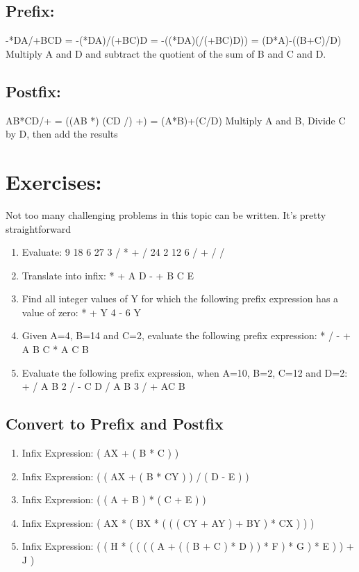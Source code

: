 \documentclass[11pt,letterpaper]{article}
\begin{document}
\subsection{Prefix:}
-*DA/+BCD = -(*DA)/(+BC)D = -((*DA)(/(+BC)D)) = (D*A)-((B+C)/D) Multiply A and D and subtract the quotient of the sum of B and C and D.

\subsection{Postfix:}
AB*CD/+ = ((AB *) (CD /) +) = (A*B)+(C/D)
Multiply A and B, Divide C by D, then add the results

\section{Exercises:}
Not too many challenging problems in this topic can be written. It's pretty straightforward

\begin{enumerate}

\item Evaluate: 9 18 6 27 3 / * + / 24 2 12 6 / + / /

\item Translate into infix: * + A D - + B C E

\item Find all integer values of Y for which the following prefix expression has
a value of zero: * + Y 4 - 6 Y

\item Given A=4, B=14 and C=2, evaluate the following prefix expression: * / - + A B C * A C B

\item Evaluate the following prefix expression, when A=10, B=2, C=12 and D=2:\\
+ / A B 2  / - C D / A B 3 / + AC B
\end{enumerate}

\subsection{Convert to Prefix and Postfix}
\label{sec:convert}

\begin{enumerate}
\item Infix Expression: ( AX + ( B * C ) ) 

\item Infix Expression: ( ( AX + ( B * CY ) ) / ( D - E ) )

\item Infix Expression: ( ( A + B ) * ( C + E ) ) 

\item Infix Expression: ( AX * ( BX * ( ( ( CY + AY ) + BY ) * CX ) ) ) 

\item Infix Expression: ( ( H * ( ( ( ( A + ( ( B + C ) * D ) ) * F ) * G ) * E ) ) + J )
\end{enumerate}
\end{document}
